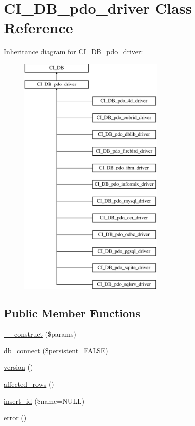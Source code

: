 \hypertarget{class_c_i___d_b__pdo__driver}{}\section{C\+I\+\_\+\+D\+B\+\_\+pdo\+\_\+driver Class Reference}
\label{class_c_i___d_b__pdo__driver}
Inheritance diagram for C\+I\+\_\+\+D\+B\+\_\+pdo\+\_\+driver\+:\begin{figure}[H]
\begin{center}
\leavevmode
\includegraphics[height=12.000000cm]{class_c_i___d_b__pdo__driver}
\end{center}
\end{figure}
\subsection*{Public Member Functions}
\begin{DoxyCompactItemize}
\item 
\mbox{\hyperlink{class_c_i___d_b__pdo__driver_a9162320adff1a1a4afd7f2372f753a3e}{\+\_\+\+\_\+construct}} (\$params)
\item 
\mbox{\hyperlink{class_c_i___d_b__pdo__driver_a52bf595e79e96cc0a7c907a9b45aeb4d}{db\+\_\+connect}} (\$persistent=F\+A\+L\+SE)
\item 
\mbox{\hyperlink{class_c_i___d_b__pdo__driver_a6080dae0886626b9a4cedb29240708b1}{version}} ()
\item 
\mbox{\hyperlink{class_c_i___d_b__pdo__driver_a77248aaad33eb132c04cc4aa3f4bc8cb}{affected\+\_\+rows}} ()
\item 
\mbox{\hyperlink{class_c_i___d_b__pdo__driver_ae61dc2c85e5516f143f6246c686bc3fc}{insert\+\_\+id}} (\$name=N\+U\+LL)
\item 
\mbox{\hyperlink{class_c_i___d_b__pdo__driver_a43b8d30b879d4f09ceb059b02af2bc02}{error}} ()
\end{DoxyCompactItemize}
